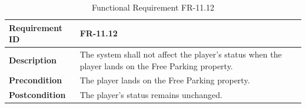 \documentclass{article}
\begin{document}
\begin{table}[ht]
    \centering
    \caption{Functional Requirement FR-11.12}
    \begin{tabular}{@{}P{3cm}P{12cm}@{}}
        \toprule
        \textbf{Requirement ID} & FR-11.12 \\ \midrule
        \textbf{Description} & The system shall not affect the player's status when the player lands on the Free Parking property. \\ \midrule
        \textbf{Precondition} & The player lands on the Free Parking property. \\ \midrule
        \textbf{Postcondition} & The player's status remains unchanged. \\ \bottomrule
    \end{tabular}
\end{table}
\end{document}
